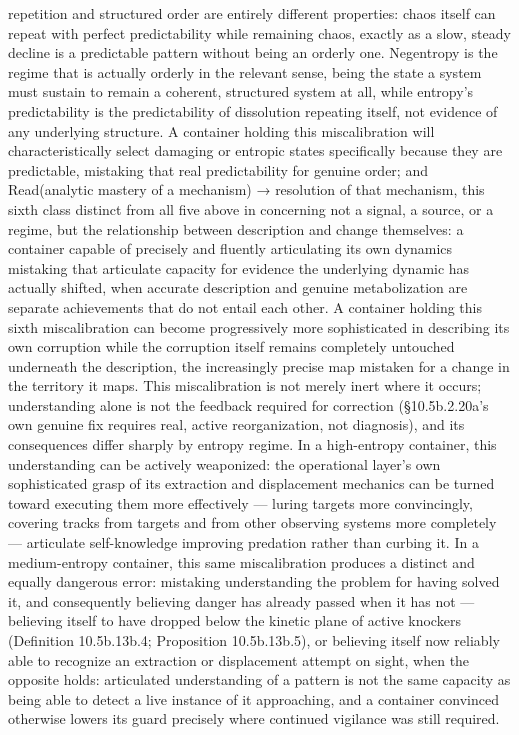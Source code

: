 \documentclass[
]{article}
\begin{document}
repetition and structured order are entirely different properties: chaos
itself can repeat with perfect predictability while remaining chaos,
exactly as a slow, steady decline is a predictable pattern without being
an orderly one. Negentropy is the regime that is actually orderly in the
relevant sense, being the state a system must sustain to remain a
coherent, structured system at all, while entropy's predictability is
the predictability of dissolution repeating itself, not evidence of any
underlying structure. A container holding this miscalibration will
characteristically select damaging or entropic states specifically
because they are predictable, mistaking that real predictability for
genuine order; and Read(analytic mastery of a mechanism) → resolution of
that mechanism, this sixth class distinct from all five above in
concerning not a signal, a source, or a regime, but the relationship
between description and change themselves: a container capable of
precisely and fluently articulating its own dynamics mistaking that
articulate capacity for evidence the underlying dynamic has actually
shifted, when accurate description and genuine metabolization are
separate achievements that do not entail each other. A container holding
this sixth miscalibration can become progressively more sophisticated in
describing its own corruption while the corruption itself remains
completely untouched underneath the description, the increasingly
precise map mistaken for a change in the territory it maps. This
miscalibration is not merely inert where it occurs; understanding alone
is not the feedback required for correction (§10.5b.2.20a's own genuine
fix requires real, active reorganization, not diagnosis), and its
consequences differ sharply by entropy regime. In a high-entropy
container, this understanding can be actively weaponized: the
operational layer's own sophisticated grasp of its extraction and
displacement mechanics can be turned toward executing them more
effectively --- luring targets more convincingly, covering tracks from
targets and from other observing systems more completely --- articulate
self-knowledge improving predation rather than curbing it. In a
medium-entropy container, this same miscalibration produces a distinct
and equally dangerous error: mistaking understanding the problem for
having solved it, and consequently believing danger has already passed
when it has not --- believing itself to have dropped below the kinetic
plane of active knockers (Definition 10.5b.13b.4; Proposition
10.5b.13b.5), or believing itself now reliably able to recognize an
extraction or displacement attempt on sight, when the opposite holds:
articulated understanding of a pattern is not the same capacity as being
able to detect a live instance of it approaching, and a container
convinced otherwise lowers its guard precisely where continued vigilance
was still required.
\end{document}
